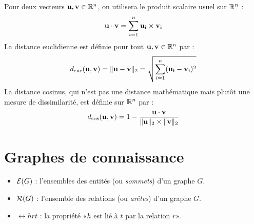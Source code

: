 Pour deux vecteurs $\bf{u, v} \in \R^n$, on utilisera le produit scalaire usuel sur $\R^n$ :
\begin{equation}
    \bf{u \cdot v} = \sum_{i=1}^{n} \bf{u_i \times v_i}
\end{equation}
La distance euclidienne est définie pour tout $\bf{u, v} \in \R^n$ par :
\begin{equation}
        d_\text{euc}(\bf{u, v}) = \| \bf{u - v} \|_2 = \sqrt{\sum_{i = 1}^{n} (\bf{u_i - v_i})^2}
\end{equation}
La distance cosinus, qui n'est pas une distance mathématique mais plutôt une mesure de dissimilarité, est définie sur $\R^n$ par :
\begin{equation}
    d_\text{cos}(\bf{u, v}) = 1 - \frac{\bf{u \cdot v}}{\| \bf{u} \|_2 \times \| \bf{v} \|_2 }
\end{equation}

\section*{Graphes de connaissance}

\begin{itemize}
    \item $\Ent(G)$ : l'ensembles des entités (ou \textit{sommets}) d'un graphe $G$.
    \item $\Rel(G)$ : l'ensemble des relations (ou \textit{arêtes}) d'un graphe $G$.
    \item $\rel{h}{r}{t}$ : la propriété «$h$ est lié à $t$ par la relation $r$».
\end{itemize}